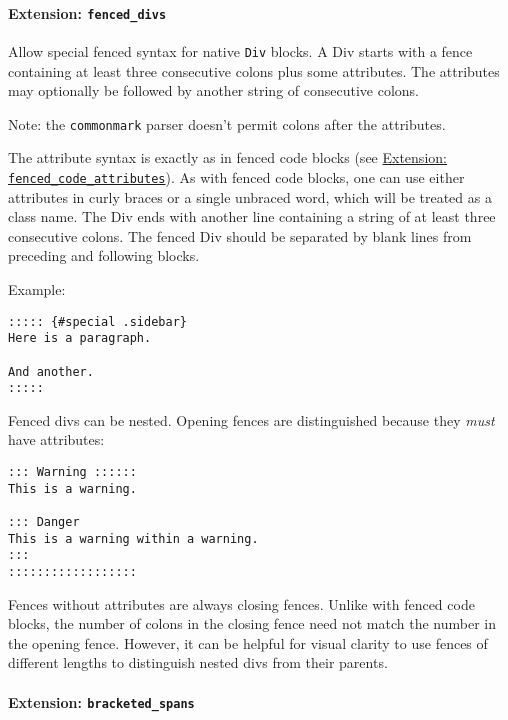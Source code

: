 \documentclass[
  a4paper,
]{article}
\begin{document}
\hypertarget{extension-fenced_divs}{%
\paragraph{\texorpdfstring{Extension:
\texttt{fenced\_divs}}{Extension: fenced\_divs}}\label{extension-fenced_divs}}

Allow special fenced syntax for native \texttt{Div} blocks. A Div starts
with a fence containing at least three consecutive colons plus some
attributes. The attributes may optionally be followed by another string
of consecutive colons.

Note: the \texttt{commonmark} parser doesn't permit colons after the
attributes.

The attribute syntax is exactly as in fenced code blocks (see
\protect\hyperlink{extension-fenced_code_attributes}{Extension:
\texttt{fenced\_code\_attributes}}). As with fenced code blocks, one can
use either attributes in curly braces or a single unbraced word, which
will be treated as a class name. The Div ends with another line
containing a string of at least three consecutive colons. The fenced Div
should be separated by blank lines from preceding and following blocks.

Example:

\begin{verbatim}
::::: {#special .sidebar}
Here is a paragraph.

And another.
:::::
\end{verbatim}

Fenced divs can be nested. Opening fences are distinguished because they
\emph{must} have attributes:

\begin{verbatim}
::: Warning ::::::
This is a warning.

::: Danger
This is a warning within a warning.
:::
::::::::::::::::::
\end{verbatim}

Fences without attributes are always closing fences. Unlike with fenced
code blocks, the number of colons in the closing fence need not match
the number in the opening fence. However, it can be helpful for visual
clarity to use fences of different lengths to distinguish nested divs
from their parents.

\hypertarget{extension-bracketed_spans}{%
\paragraph{\texorpdfstring{Extension:
\texttt{bracketed\_spans}}{Extension: bracketed\_spans}}\label{extension-bracketed_spans}}
\end{document}
